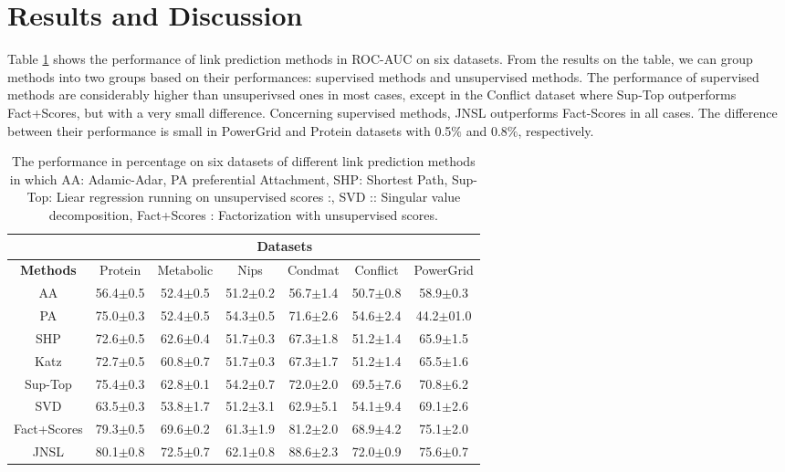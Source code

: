 \documentclass[runningheads,a4paper]{llncs}
\begin{document}
\section{Results and Discussion}
Table \ref{result_table} shows the performance of link prediction methods in ROC-AUC on six datasets. From the results on the table, we can group methods into two groups based on their performances: supervised methods and unsupervised methods. The performance of supervised methods are considerably higher than unsuperivsed ones in most cases, except in the Conflict dataset where Sup-Top outperforms Fact+Scores, but with a very small difference. Concerning supervised methods, JNSL outperforms Fact-Scores in all cases. The difference between their performance is small in PowerGrid and Protein datasets with 0.5$\%$ and 0.8$\%$, respectively.

\begin{table}
\caption{The performance in percentage on six datasets of different link prediction methods in which AA: Adamic-Adar, PA \cite{pa} preferential Attachment, SHP: Shortest Path, Sup-Top: Liear regression running on unsupervised scores \cite{matrix-factorization}:, SVD \cite{matrix-factorization}:: Singular value decomposition, Fact+Scores \cite{matrix-factorization}: Factorization with unsupervised scores. }
\centering
\setlength{\tabcolsep}{1mm}
\begin{tabular}{|c|c|c|c|c|c|c|}

\hline
         & \multicolumn{6}{c|}{\textbf{Datasets}}\\
 \hline
\textbf{Methods} & Protein & Metabolic & Nips & Condmat & Conflict & PowerGrid\\
\hline
AA & 56.4$\pm$0.5 & 52.4$\pm$0.5 & 51.2$\pm$0.2 & 56.7$\pm$1.4 & 50.7$\pm$0.8 & 58.9$\pm$0.3\\
PA & 75.0$\pm$0.3 & 52.4$\pm$0.5 & 54.3$\pm$0.5 & 71.6$\pm$2.6 & 54.6$\pm$2.4 & 44.2$\pm$01.0\\
SHP & 72.6$\pm$0.5 & 62.6$\pm$0.4 & 51.7$\pm$0.3 & 67.3$\pm$1.8 & 51.2$\pm$1.4 & 65.9$\pm$1.5\\
Katz & 72.7$\pm$0.5 & 60.8$\pm$0.7 & 51.7$\pm$0.3 & 67.3$\pm$1.7 & 51.2$\pm$1.4 & 65.5$\pm$1.6 \\
Sup-Top & 75.4$\pm$0.3 & 62.8$\pm$0.1 & 54.2$\pm$0.7 & 72.0$\pm$2.0 & 69.5$\pm$7.6 & 70.8$\pm$6.2\\
SVD & 63.5$\pm$0.3 & 53.8$\pm$1.7 & 51.2$\pm$3.1 & 62.9$\pm$5.1 & 54.1$\pm$9.4 & 69.1$\pm$2.6\\
Fact+Scores & 79.3$\pm$0.5 & 69.6$\pm$0.2 & 61.3$\pm$1.9 & 81.2$\pm$2.0 & 68.9$\pm$4.2 & 75.1$\pm$2.0 \\
JNSL & 80.1$\pm$0.8 & 72.5$\pm$0.7 & 62.1$\pm$0.8 & 88.6$\pm$2.3 & 72.0$\pm$0.9 & 75.6$\pm$0.7 \\
 \hline 
\end{tabular}
\label{result_table}
\end{table}
\end{document}
